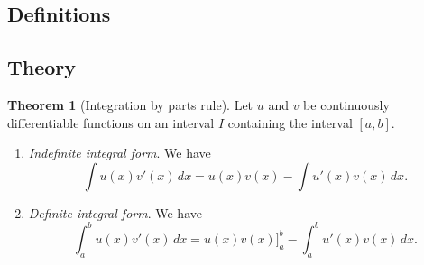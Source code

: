 \documentclass[11pt]{article}
\theoremstyle{definition}
\theoremstyle{named}
\newtheorem*{namedtheorem}{Theorem}
\numberwithin{myalgctr}{section}
\begin{document}
\thispagestyle{fancy}
\subsection*{Definitions}


 \subsection*{Theory}

\begin{namedtheorem}[Integration by parts rule]
Let $u$ and $v$ be continuously differentiable functions on an interval $I$ containing the interval $[a,b]$.
\begin{enumerate}
  \item {\em Indefinite integral form}. We have
  \[
  \int u(x)v'(x)\, dx= u(x)v(x)-\int u'(x)v(x)\, dx.
  \]
  \item {\em Definite integral form}. We have
  \[
  \int_a^b u(x)v'(x)\, dx= u(x)v(x)\Bigr]_a^b-\int_a^b u'(x)v(x)\, dx.
  \]
\end{enumerate}
\end{namedtheorem}

\end{document}

